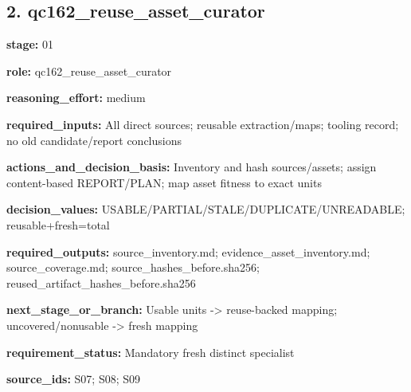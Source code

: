 \documentclass[10pt,a4paper]{article}
\begin{document}
\subsection*{2.\allowbreak{} qc162\_\allowbreak{}reuse\_\allowbreak{}asset\_\allowbreak{}curator}
\textbf{stage:} 01\par
\textbf{role:} qc162\_\allowbreak{}reuse\_\allowbreak{}asset\_\allowbreak{}curator\par
\textbf{reasoning\_\allowbreak{}effort:} medium\par
\textbf{required\_\allowbreak{}inputs:} All direct sources; reusable extraction/\allowbreak{}maps; tooling record; no old candidate/\allowbreak{}report conclusions\par
\textbf{actions\_\allowbreak{}and\_\allowbreak{}decision\_\allowbreak{}basis:} Inventory and hash sources/\allowbreak{}assets; assign content-\allowbreak{}based REPORT/\allowbreak{}PLAN; map asset fitness to exact units\par
\textbf{decision\_\allowbreak{}values:} USABLE/\allowbreak{}PARTIAL/\allowbreak{}STALE/\allowbreak{}DUPLICATE/\allowbreak{}UNREADABLE; reusable+fresh=total\par
\textbf{required\_\allowbreak{}outputs:} source\_\allowbreak{}inventory.\allowbreak{}md; evidence\_\allowbreak{}asset\_\allowbreak{}inventory.\allowbreak{}md; source\_\allowbreak{}coverage.\allowbreak{}md; source\_\allowbreak{}hashes\_\allowbreak{}before.\allowbreak{}sha256; reused\_\allowbreak{}artifact\_\allowbreak{}hashes\_\allowbreak{}before.\allowbreak{}sha256\par
\textbf{next\_\allowbreak{}stage\_\allowbreak{}or\_\allowbreak{}branch:} Usable units -\allowbreak{}> reuse-\allowbreak{}backed mapping; uncovered/\allowbreak{}nonusable -\allowbreak{}> fresh mapping\par
\textbf{requirement\_\allowbreak{}status:} Mandatory fresh distinct specialist\par
\textbf{source\_\allowbreak{}ids:} S07; S08; S09\par
\end{document}
